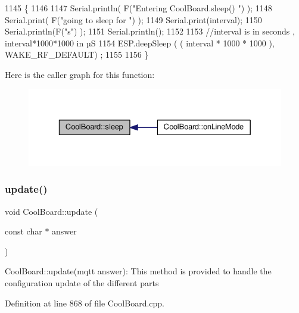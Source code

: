 \begin{DoxyCode}
1145 \{
1146 
1147     Serial.println( F(\textcolor{stringliteral}{"Entering CoolBoard.sleep() "}) );
1148     Serial.print( F(\textcolor{stringliteral}{"going to sleep for "}) );
1149     Serial.print(interval);
1150     Serial.println(F(\textcolor{stringliteral}{"s"}) );
1151     Serial.println();
1152     
1153     \textcolor{comment}{//interval is in seconds , interval*1000*1000 in µS}
1154     ESP.deepSleep ( ( interval * 1000 * 1000 ), WAKE\_RF\_DEFAULT) ;
1155 
1156 \}
\end{DoxyCode}
Here is the caller graph for this function\+:\nopagebreak
\begin{figure}[H]
\begin{center}
\leavevmode
\includegraphics[width=329pt]{d7/df9/class_cool_board_a069952cdcb2e7f68518aa429eceadb6e_icgraph}
\end{center}
\end{figure}
\mbox{\label{class_cool_board_a8612756d3f73198cdde857a66f0fe690}} 
\subsubsection{\texorpdfstring{update()}{update()}}
{\footnotesize\ttfamily void Cool\+Board\+::update (\begin{DoxyParamCaption}\item[{const char $\ast$}]{answer }\end{DoxyParamCaption})}

Cool\+Board\+::update(mqtt answer)\+: This method is provided to handle the configuration update of the different parts 

Definition at line 868 of file Cool\+Board.\+cpp.


